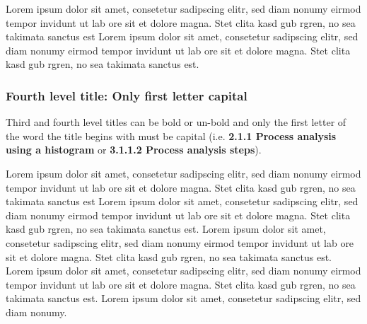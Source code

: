 Lorem ipsum dolor sit amet, consetetur sadipscing elitr, sed diam nonumy eirmod tempor invidunt ut lab ore sit et dolore magna. Stet clita kasd gub rgren, no sea takimata sanctus est Lorem ipsum dolor sit amet, consetetur sadipscing elitr, sed diam nonumy eirmod tempor invidunt ut lab ore sit et dolore magna. Stet clita kasd gub rgren, no sea takimata sanctus est.

\subsubsection{Fourth level title: Only first letter capital}

Third and fourth level titles can be bold or un-bold and only the first letter of the word the title begins with must be capital (i.e. \textbf{2.1.1 Process analysis using a histogram} or \textbf{3.1.1.2 Process analysis steps}).


Lorem ipsum dolor sit amet, consetetur sadipscing elitr, sed diam nonumy eirmod tempor invidunt ut lab ore sit et dolore magna. Stet clita kasd gub rgren, no sea takimata sanctus est Lorem ipsum dolor sit amet, consetetur sadipscing elitr, sed diam nonumy eirmod tempor invidunt ut lab ore sit et dolore magna. Stet clita kasd gub rgren, no sea takimata sanctus est. Lorem ipsum dolor sit amet, consetetur sadipscing elitr, sed diam nonumy eirmod tempor invidunt ut lab ore sit et dolore magna. Stet clita kasd gub rgren, no sea takimata sanctus est. Lorem ipsum dolor sit amet, consetetur sadipscing elitr, sed diam nonumy eirmod tempor invidunt ut lab ore sit et dolore magna. Stet clita kasd gub rgren, no sea takimata sanctus est. Lorem ipsum dolor sit amet, consetetur sadipscing elitr, sed diam nonumy.